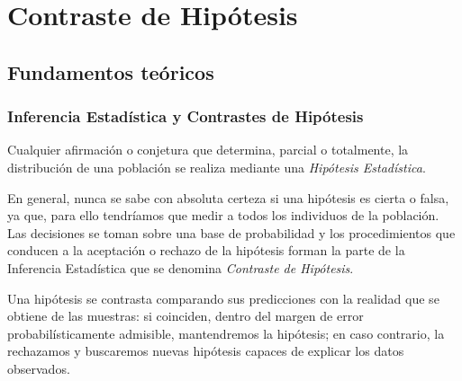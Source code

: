 
\chapter{Contraste de Hipótesis}

\section{Fundamentos teóricos}

\subsection{Inferencia Estadística y Contrastes de Hipótesis}

Cualquier afirmación o conjetura que determina, parcial o totalmente, la distribución de una población se realiza
mediante una \emph{Hipótesis Estadística}.

En general, nunca se sabe con absoluta certeza si una hipótesis es cierta o falsa, ya que, para ello tendríamos que
medir a todos los individuos de la población. Las decisiones se toman sobre una base de probabilidad y los
procedimientos que conducen a la aceptación o rechazo de la hipótesis forman la parte de la Inferencia Estadística que
se denomina \emph{Contraste de Hipótesis}.

Una hipótesis se contrasta comparando sus predicciones con la realidad que se obtiene de las muestras: si coinciden,
dentro del margen de error probabilísticamente admisible, mantendremos la hipótesis; en caso contrario, la rechazamos y
buscaremos nuevas hipótesis capaces de explicar los datos observados.

